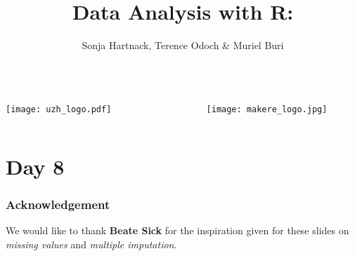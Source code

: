 \documentclass{beamer}\usepackage[]{graphicx}\usepackage[]{color}
\title{\textbf{Data Analysis with R:} \\ \lecturetopic}
\author{Sonja Hartnack, Terence Odoch \& Muriel Buri}
\institute{October 2017}
\date{ }
\begin{document}



\begin{frame}
\begin{columns}
\begin{column}{.3\linewidth}
\begin{center}
\texttt{[image: uzh\_logo.pdf]}
\end{center}
\end{column}
\begin{column}{0.2\linewidth}
\end{column}
\begin{column}{.3\linewidth}
\begin{center}
\texttt{[image: makere\_logo.jpg]}
\end{center}
\end{column}
\end{columns}
\titlepage
\end{frame}

\section{Day 8}
\usebackgroundtemplate{}
\begin{frame}
\frametitle{Acknowledgement}
\LARGE
We would like to thank \textbf{Beate Sick} for the inspiration given for these slides on \textit{missing values} and \textit{multiple imputation}.
\end{frame}
\end{document}
